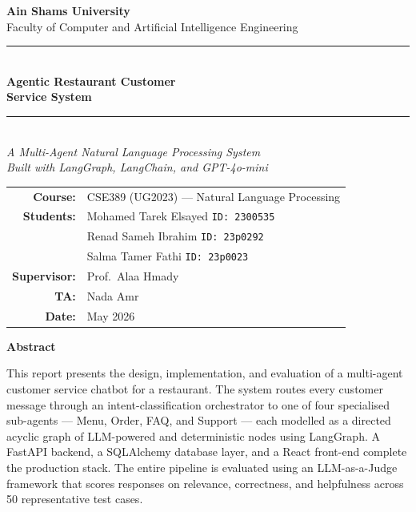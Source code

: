 \documentclass[12pt,a4paper]{report}
\begin{document}

\begin{titlepage}
\centering
\vspace*{1cm}

{\Large \textbf{\textcolor{primary}{Ain Shams University}}}\\[0.2cm]
{\large \textcolor{primary}{Faculty of Computer and Artificial Intelligence Engineering}}\\[1.2cm]

\rule{\linewidth}{1.5pt}\\[0.4cm]
{\Huge \textbf{\textcolor{primary}{Agentic Restaurant Customer\\[0.2cm] Service System}}}\\[0.3cm]
\rule{\linewidth}{1.5pt}\\[1cm]

{\Large \textit{A Multi-Agent Natural Language Processing System\\
Built with LangGraph, LangChain, and GPT-4o-mini}}\\[1.5cm]

\begin{tabular}{rl}
\textbf{Course:}    & CSE389 (UG2023) — Natural Language Processing \\[0.4cm]
\textbf{Students:}  & Mohamed Tarek Elsayed \quad \texttt{ID: 2300535}\\[0.15cm]
                    & Renad Sameh Ibrahim \quad \texttt{ID: 23p0292}\\[0.15cm]
                    & Salma Tamer Fathi \quad \texttt{ID: 23p0023}\\[0.4cm]
\textbf{Supervisor:}& Prof.\ Alaa Hmady \\[0.15cm]
\textbf{TA:}        & Nada Amr \\[0.4cm]
\textbf{Date:}      & May 2026 \\
\end{tabular}

\vfill

\begin{infobox}
\centering
\textbf{Abstract}\\[0.3cm]
\begin{flushleft}
This report presents the design, implementation, and evaluation of a multi-agent customer
service chatbot for a restaurant. The system routes every customer message through an
intent-classification orchestrator to one of four specialised sub-agents — Menu, Order,
FAQ, and Support — each modelled as a directed acyclic graph of LLM-powered and
deterministic nodes using LangGraph. A FastAPI backend, a SQLAlchemy database layer,
and a React front-end complete the production stack. The entire pipeline is evaluated
using an LLM-as-a-Judge framework that scores responses on relevance, correctness,
and helpfulness across 50 representative test cases.
\end{flushleft}
\end{infobox}

\end{titlepage}
\end{document}
